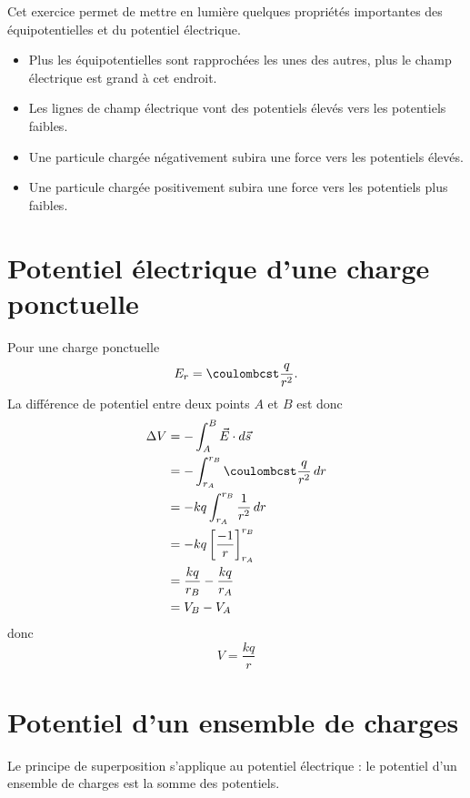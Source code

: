 Cet exercice permet de mettre en lumière quelques propriétés importantes des
équipotentielles et du potentiel électrique.

\begin{itemize}
  \item Plus les équipotentielles sont rapprochées les unes des autres, plus le
    champ électrique est grand à cet endroit.
  \item Les lignes de champ électrique vont des potentiels élevés vers les
    potentiels faibles.
  \item Une particule chargée négativement subira une force vers les potentiels
    élevés.
  \item Une particule chargée positivement subira une force vers les potentiels
    plus faibles.
\end{itemize}



\section{Potentiel électrique d'une charge ponctuelle}


Pour une charge ponctuelle
\[
  E_r = \coulombcst \frac{q}{r^2}.
\]
La différence de potentiel entre deux points $A$ et $B$ est donc
\begin{align*}
  \Delta V &= -\int_A^B \vec{E}\cdot d\vec{s} \\
    &= -\int_{r_A}^{r_B} \coulombcst \frac{q}{r^2} \,dr \\
    &= -kq \int_{r_A}^{r_B} \frac{1}{r^2} \,dr \\
    &= -kq \left[ \frac{-1}{r} \right]_{r_A}^{r_B} \\
    &= \frac{kq}{r_B} - \frac{kq}{r_A} \\
    &= V_B - V_A
\end{align*}
donc
$$V = \frac{kq}{r}$$



\section{Potentiel d'un ensemble de charges}


\begin{fondamentalbox}
Le principe de superposition s'applique au potentiel électrique :
le potentiel d'un ensemble de charges est la somme des potentiels.
\end{fondamentalbox}

